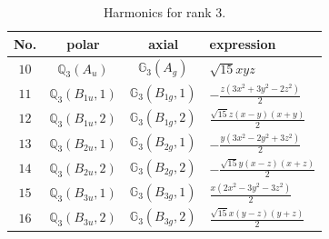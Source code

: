 \documentclass[fleqn,8pt,landscape]{jsarticle}
\begin{document}
\begin{table}[ht!]
\begin{center}
\caption{Harmonics for rank 3.}
\renewcommand{\arraystretch}{1.3}
\begin{tabular}{cccl} \hline \hline
No. & polar & axial & expression \\ \hline
$ 10 $ & $ \mathbb{Q}_{3}(A_{u}) $ & $ \mathbb{G}_{3}(A_{g}) $ & $ \sqrt{15} x y z $ \\
$ 11 $ & $ \mathbb{Q}_{3}(B_{1u},1) $ & $ \mathbb{G}_{3}(B_{1g},1) $ & $ - \frac{z \left(3 x^{2} + 3 y^{2} - 2 z^{2}\right)}{2} $ \\
$ 12 $ & $ \mathbb{Q}_{3}(B_{1u},2) $ & $ \mathbb{G}_{3}(B_{1g},2) $ & $ \frac{\sqrt{15} z \left(x - y\right) \left(x + y\right)}{2} $ \\
$ 13 $ & $ \mathbb{Q}_{3}(B_{2u},1) $ & $ \mathbb{G}_{3}(B_{2g},1) $ & $ - \frac{y \left(3 x^{2} - 2 y^{2} + 3 z^{2}\right)}{2} $ \\
$ 14 $ & $ \mathbb{Q}_{3}(B_{2u},2) $ & $ \mathbb{G}_{3}(B_{2g},2) $ & $ - \frac{\sqrt{15} y \left(x - z\right) \left(x + z\right)}{2} $ \\
$ 15 $ & $ \mathbb{Q}_{3}(B_{3u},1) $ & $ \mathbb{G}_{3}(B_{3g},1) $ & $ \frac{x \left(2 x^{2} - 3 y^{2} - 3 z^{2}\right)}{2} $ \\
$ 16 $ & $ \mathbb{Q}_{3}(B_{3u},2) $ & $ \mathbb{G}_{3}(B_{3g},2) $ & $ \frac{\sqrt{15} x \left(y - z\right) \left(y + z\right)}{2} $ \\
 \hline \hline
\end{tabular}
\end{center}
\end{table}
\end{document}
